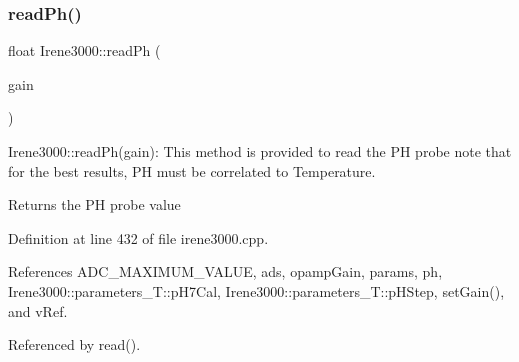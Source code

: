\subsubsection{\texorpdfstring{read\+Ph()}{readPh()}}
{\footnotesize\ttfamily float Irene3000\+::read\+Ph (\begin{DoxyParamCaption}\item[{ads\+Gain\+\_\+t}]{gain }\end{DoxyParamCaption})}

Irene3000\+::read\+Ph(gain)\+: This method is provided to read the PH probe note that for the best results, PH must be correlated to Temperature.

\begin{DoxyReturn}{Returns}
the PH probe value 
\end{DoxyReturn}


Definition at line 432 of file irene3000.\+cpp.



References A\+D\+C\+\_\+\+M\+A\+X\+I\+M\+U\+M\+\_\+\+V\+A\+L\+UE, ads, opamp\+Gain, params, ph, Irene3000\+::parameters\+\_\+\+T\+::p\+H7\+Cal, Irene3000\+::parameters\+\_\+\+T\+::p\+H\+Step, set\+Gain(), and v\+Ref.



Referenced by read().


